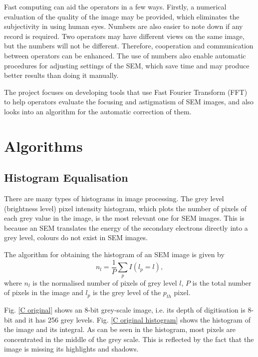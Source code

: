\documentclass[conference]{IEEEtran}
\begin{document}
Fast computing can aid the operators in a few ways. Firstly, a numerical evaluation of the quality of the image may be provided, which eliminates the subjectivity in using human eyes. Numbers are also easier to note down if any record is required. Two operators may have different views on the same image, but the numbers will not be different. Therefore, cooperation and communication between operators can be enhanced. The use of numbers also enable automatic procedures for adjusting settings of the SEM, which save time and may produce better results than doing it manually.

The project focuses on developing tools that use Fast Fourier Transform (FFT) to help operators evaluate the focusing and astigmatism of SEM images, and also looks into an algorithm for the automatic correction of them.

\section{Algorithms}
\subsection{Histogram Equalisation}
There are many types of histograms in image processing. The grey level (brightness level) pixel intensity histogram, which plots the number of pixels of each grey value in the image, is the most relevant one for SEM images. This is because an SEM translates the energy of the secondary electrons directly into a grey level, colours do not exist in SEM images.

The algorithm for obtaining the histogram of an SEM image is given by
\begin{equation}
    n_l = \frac{1}{P} \sum_{p} I(l_p=l),
\end{equation}
where $n_l$ is the normalised number of pixels of grey level $l$, $P$ is the total number of pixels in the image and $l_p$ is the grey level of the $p_{th}$ pixel. 

Fig. \ref{C original} shows an 8-bit grey-scale image, i.e. its depth of digitisation is 8-bit and it has 256 grey levels. Fig. \ref{C original histogram} shows the histogram of the image and its integral. As can be seen in the histogram, most pixels are concentrated in the middle of the grey scale. This is reflected by the fact that the image is missing its highlights and shadows.
\end{document}
